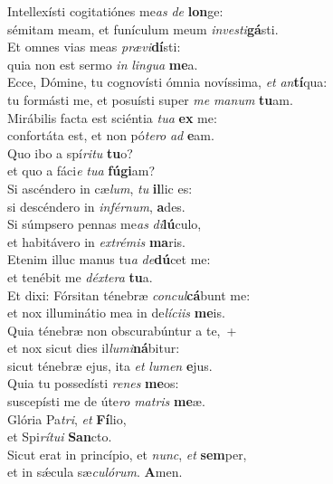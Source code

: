 \evenverse Intellexísti cogitatiónes me\textit{as} \textit{de} \textbf{lon}ge:~\*\\
\evenverse sémitam meam, et funículum meum \textit{in}\textit{ve}\textit{sti}\textbf{gá}sti.\\
\oddverse Et omnes vias meas \textit{præ}\textit{vi}\textbf{dí}sti:~\*\\
\oddverse quia non est sermo \textit{in} \textit{lin}\textit{gua} \textbf{me}a.\\
\evenverse Ecce, Dómine, tu cognovísti ómnia novíssima, \textit{et} \textit{an}\textbf{tí}qua:~\*\\
\evenverse tu formásti me, et posuísti super \textit{me} \textit{ma}\textit{num} \textbf{tu}am.\\
\oddverse Mirábilis facta est sciéntia \textit{tu}\textit{a} \textbf{ex} me:~\*\\
\oddverse confortáta est, et non pó\textit{te}\textit{ro} \textit{ad} \textbf{e}am.\\
\evenverse Quo ibo a spí\textit{ri}\textit{tu} \textbf{tu}o?~\*\\
\evenverse et quo a fáci\textit{e} \textit{tu}\textit{a} \textbf{fú}\textbf{gi}am?\\
\oddverse Si ascéndero in cæ\textit{lum}, \textit{tu} \textbf{il}lic es:~\*\\
\oddverse si descéndero in \textit{in}\textit{fér}\textit{num}, \textbf{a}des.\\
\evenverse Si súmpsero pennas me\textit{as} \textit{di}\textbf{lú}culo,~\*\\
\evenverse et habitávero in \textit{ex}\textit{tré}\textit{mis} \textbf{ma}ris.\\
\oddverse Etenim illuc manus tu\textit{a} \textit{de}\textbf{dú}cet me:~\*\\
\oddverse et tenébit me \textit{déx}\textit{te}\textit{ra} \textbf{tu}a.\\
\evenverse Et dixi: Fórsitan ténebræ \textit{con}\textit{cul}\textbf{cá}bunt me:~\*\\
\evenverse et nox illuminátio mea in de\textit{lí}\textit{ci}\textit{is} \textbf{me}is.\\
\oddverse Quia ténebræ non obscurabúntur a te,~+\\
\oddverse  et nox sicut dies il\textit{lu}\textit{mi}\textbf{ná}bitur:~\*\\
\oddverse sicut ténebræ ejus, ita \textit{et} \textit{lu}\textit{men} \textbf{e}jus.\\
\evenverse Quia tu possedísti \textit{re}\textit{nes} \textbf{me}os:~\*\\
\evenverse suscepísti me de úte\textit{ro} \textit{ma}\textit{tris} \textbf{me}æ.\\
\oddverse Glória Pa\textit{tri}, \textit{et} \textbf{Fí}lio,~\*\\
\oddverse et Spi\textit{rí}\textit{tu}\textit{i} \textbf{San}cto.\\
\evenverse Sicut erat in princípio, et \textit{nunc}, \textit{et} \textbf{sem}per,~\*\\
\evenverse et in sǽcula sæ\textit{cu}\textit{ló}\textit{rum}. \textbf{A}men.\\
